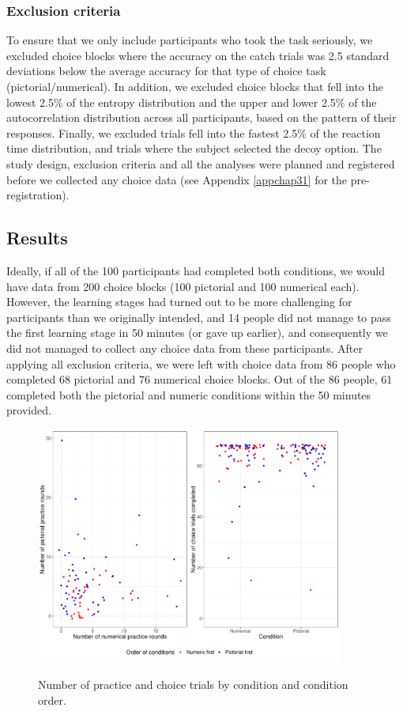 \documentclass[11pt,a4paper]{article}
\begin{document}
\subsubsection{Exclusion criteria}

To ensure that we only include participants who took the task seriously, we excluded choice blocks where the accuracy on the catch trials was 2.5 standard deviations below the average accuracy for that type of choice task (pictorial/numerical). In addition, we excluded choice blocks that fell into the lowest 2.5\% of the entropy distribution
and the upper and lower 2.5\% of the autocorrelation distribution across all participants, based on the pattern of their responses. Finally, we excluded trials fell into the fastest 2.5\% of
the reaction time distribution, and trials where the subject selected the decoy option.
The study design, exclusion criteria and all the analyses were planned and
registered before we collected any choice data (see Appendix \ref{appchap31} for the pre-registration).

\subsection{Results}

Ideally, if all of the 100 participants had completed both conditions, we would have data from 200 choice blocks (100 pictorial and 100 numerical each). However, the learning stages had turned out to be more challenging for participants than we originally intended, and 14 people did not manage to pass the first learning stage in 50 minutes (or gave up earlier), and consequently we did not managed to collect any choice data from these participants. After applying all exclusion criteria, we were left with choice data from 86 people who completed 68 pictorial and 76 numerical choice blocks. Out of the 86 people, 61 completed both the pictorial and numeric conditions within the 50 minutes provided.

\begin{figure}
\centering
\caption{Number of practice and choice trials by condition and condition order.}
\includegraphics[width=0.9\textwidth]{./Explor_teapot.pdf}
\label{fig:Explor_teapot}
\end{figure}
\end{document}
